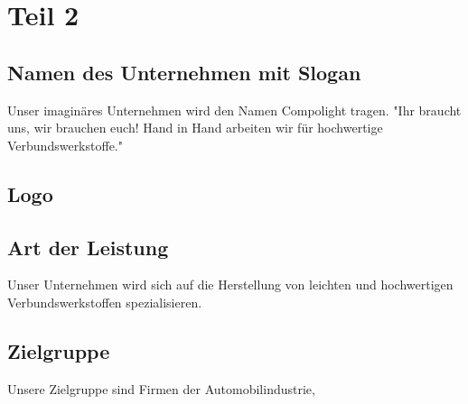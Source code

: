 \section{Teil 2}
    \subsection{Namen des Unternehmen mit Slogan}
    Unser imaginäres Unternehmen wird den Namen Compolight tragen.
    "Ihr braucht uns, wir brauchen euch! Hand in Hand arbeiten wir für hochwertige Verbundswerkstoffe."
    \subsection{Logo}

    \subsection{Art der Leistung}
    Unser Unternehmen wird sich auf die Herstellung von leichten und hochwertigen Verbundswerkstoffen spezialisieren.
    \subsection{Zielgruppe}
    Unsere Zielgruppe sind Firmen der Automobilindustrie, 